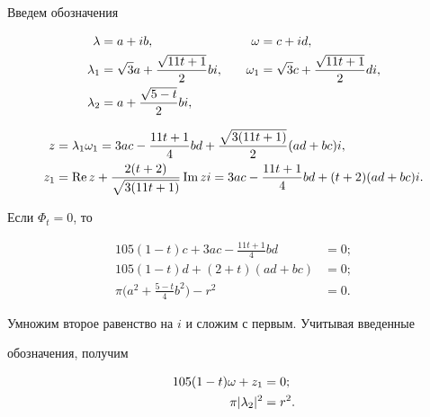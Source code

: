 \begin{pf}


Введем обозначения


\begin{alignat*}{2}


\l&=a+ib,&\quad \omega&=c+id,\\


\l_1&=\sqrt{3}a+\frac{\sqrt{11t+1}}{2}bi,&\quad


\omega_1&=\sqrt{3}c+\frac{\sqrt{11t+1}}{2}di,\\


\l_2&=a+\frac{\sqrt{5-t}}{2}bi,&\quad &\


\end{alignat*}


\begin{align*}


z&=\l_1\omega_1=3ac-\frac{11t+1}{4}bd+\frac{\sqrt{3(11t+1)}}


{2}(ad+bc)i,\\


z_1&=\re z+\frac{2(t+2)}{\sqrt{3(11t+1)}}\im zi=


3ac-\frac{11t+1}{4}bd+(t+2)(ad+bc)i.


\end{align*}


Если $\Phi_t=0$, то 


\begin{align*}


105(1-t)c+3ac-\frac{11t+1}{4}bd&=0;\\


105(1-t)d+(2+t)(ad+bc)&=0;\\


\pi \bigg(a^2+\frac{5-t}{4}b^2\bigg)-r^2&=0.


\end{align*}


Умножим второе равенство на $i$ и сложим с первым. Учитывая введенные


обозначения, получим


\begin{equation}\label{ur}


\begin{split}


105(1-t)\omega+z_1&=0;\\


\pi|\l_2|^2&=r^2.


\end{split}


\end{equation}



\end{pf}
